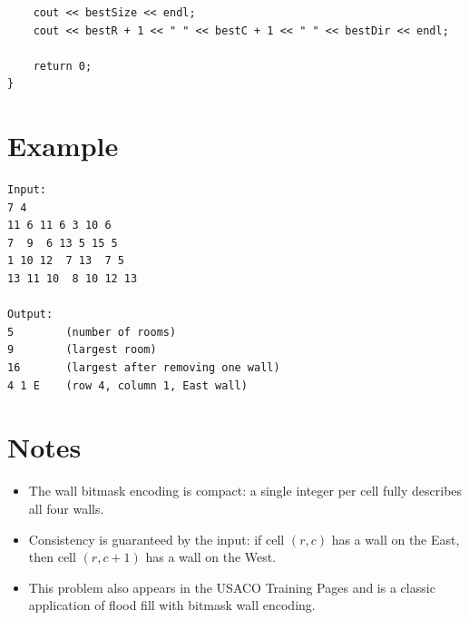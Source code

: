 \documentclass[11pt,a4paper]{article}
\begin{document}
\begin{lstlisting}
    cout << bestSize << endl;
    cout << bestR + 1 << " " << bestC + 1 << " " << bestDir << endl;

    return 0;
}
\end{lstlisting}

\section{Example}

\begin{verbatim}
Input:
7 4
11 6 11 6 3 10 6
7  9  6 13 5 15 5
1 10 12  7 13  7 5
13 11 10  8 10 12 13

Output:
5        (number of rooms)
9        (largest room)
16       (largest after removing one wall)
4 1 E    (row 4, column 1, East wall)
\end{verbatim}

\section{Notes}

\begin{itemize}
  \item The wall bitmask encoding is compact: a single integer per cell
    fully describes all four walls.
  \item Consistency is guaranteed by the input: if cell $(r,c)$ has a wall
    on the East, then cell $(r, c+1)$ has a wall on the West.
  \item This problem also appears in the USACO Training Pages and is a
    classic application of flood fill with bitmask wall encoding.
\end{itemize}
\end{document}
